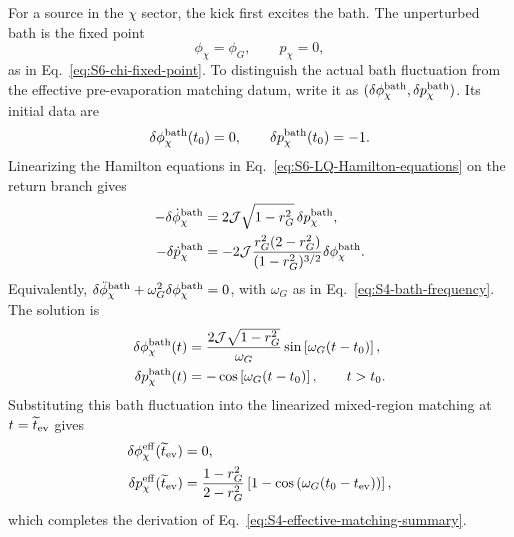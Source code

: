 \documentclass[11pt,a4paper]{article}
\begin{document}
For a source in the \(\chi\) sector, the kick first excites the bath. The
unperturbed bath is the fixed point
\begin{equation}
  \phi_\chi=\phi_G,
  \qquad
  p_\chi=0,
\label{eq:S4-chi-fixed-point}
\end{equation}
as in Eq.~\eqref{eq:S6-chi-fixed-point}. To distinguish the actual bath
fluctuation from the effective pre-evaporation matching datum, write it as
\((\delta\phi_\chi^{\rm bath},\delta p_\chi^{\rm bath})\). Its initial data
are
\begin{equation}
  \delta\phi_\chi^{\rm bath}(t_0)=0,
  \qquad
  \delta p_\chi^{\rm bath}(t_0)=-1.
\label{eq:S4-chi-local-kick}
\end{equation}
Linearizing the Hamilton equations in
Eq.~\eqref{eq:S6-LQ-Hamilton-equations} on the return branch gives
\begin{equation}
\begin{aligned}
  -\delta\dot\phi_\chi^{\rm bath}
  &=
  2\mathcal J\sqrt{1-r_G^2}\,
  \delta p_\chi^{\rm bath},
  \\
  -\delta\dot p_\chi^{\rm bath}
  &=
  -2\mathcal J
  \frac{
  r_G^2(2-r_G^2)
  }{
  (1-r_G^2)^{3/2}
  }
  \delta\phi_\chi^{\rm bath}.
\end{aligned}
\label{eq:S4-bath-linearized-equations}
\end{equation}
Equivalently,
\(\delta\ddot\phi_\chi^{\rm bath}
+\omega_G^2\delta\phi_\chi^{\rm bath}=0\), with \(\omega_G\) as in
Eq.~\eqref{eq:S4-bath-frequency}. The solution is
\begin{equation}
\begin{aligned}
  \delta\phi_\chi^{\rm bath}(t)
  &=
  \frac{
  2\mathcal J\sqrt{1-r_G^2}
  }{
  \omega_G
  }
  \sin\left[
  \omega_G(t-t_0)
  \right],
  \\
  \delta p_\chi^{\rm bath}(t)
  &=
  -\cos\left[
  \omega_G(t-t_0)
  \right],
  \qquad
  t>t_0.
\end{aligned}
\label{eq:S4-bath-kick-solution}
\end{equation}
Substituting this bath fluctuation into the linearized mixed-region matching
at \(t=\widetilde t_{\rm ev}\) gives
\begin{equation}
\begin{aligned}
  \delta\phi_\chi^{\rm eff}(\widetilde t_{\rm ev})
  &=
  0,
  \\
  \delta p_\chi^{\rm eff}(\widetilde t_{\rm ev})
  &=
  \frac{1-r_G^2}{2-r_G^2}
  \left[
  1-
  \cos\left(
  \omega_G(t_0-t_{\rm ev})
  \right)
  \right],
\end{aligned}
\label{eq:S4-chi-effective-momentum}
\end{equation}
which completes the derivation of
Eq.~\eqref{eq:S4-effective-matching-summary}.
\end{document}
